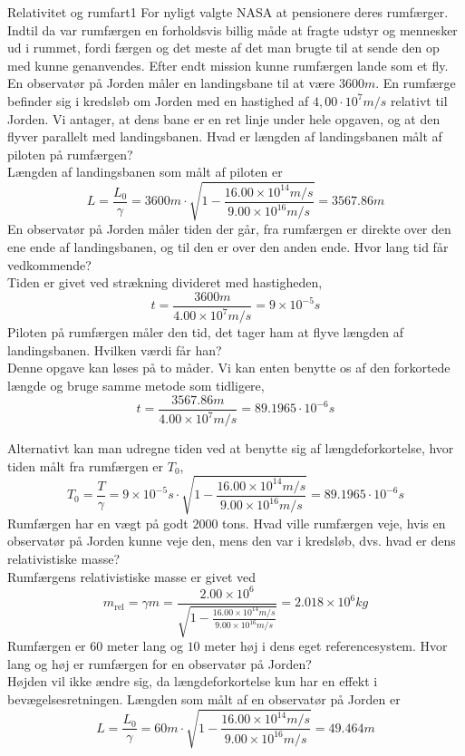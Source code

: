 \documentclass[crop=false, class=memoir]{standalone}
\begin{document}
\begin{opgave}{Relativitet og rumfart}{1}
	For nyligt valgte NASA at pensionere deres rumfærger. Indtil da var rumfærgen en forholdsvis billig måde at
	fragte udstyr og mennesker ud i rummet, fordi færgen og det meste af det man brugte til at sende den op med
	kunne genanvendes. Efter endt mission kunne rumfærgen lande som et fly.\\
	\indent
	En observatør på Jorden måler en landingsbane til at være $3600 \si{m}$. En rumfærge befinder sig i kredsløb om
	Jorden med en hastighed af $4,00 \cdot 10^7 \si{m/s}$ relativt til Jorden. Vi antager, at dens bane er en ret linje under hele
	opgaven, og at den flyver parallelt med landingsbanen.
	\opg Hvad er længden af landingsbanen målt af piloten på rumfærgen?\\
	
	Længden af landingsbanen som målt af piloten er
	$$L=\frac{L_0}{\gamma}=3600 \si{m} \cdot \sqrt{1-\frac{16.00 \times 10^{14} \si{m/s}}{9.00 \times 10^{16} \si{m/s}}} = 3567.86 \si{m}$$
	\opg En observatør på Jorden måler tiden der går, fra rumfærgen er direkte over den ene ende af landingsbanen,
	og til den er over den anden ende. Hvor lang tid får vedkommende?\\
	
	Tiden er givet ved strækning divideret med hastigheden,
	$$t=\frac{3600 \si{m}}{4.00 \times 10^7 \si{m/s}} = 9 \times 10^{-5} \si{s}$$
	\opg Piloten på rumfærgen måler den tid, det tager ham at flyve længden af landingsbanen. Hvilken værdi får
	han?\\
	
	Denne opgave kan løses på to måder. Vi kan enten benytte os af den forkortede længde og bruge samme metode som tidligere,
	$$t=\frac{3567.86 \si{m}}{4.00 \times 10^7 \si{m/s}}=89.1965 \cdot 10^{-6} \si{s}$$
	
	Alternativt kan man udregne tiden ved at benytte sig af længdeforkortelse, hvor tiden målt fra rumfærgen er $T_0$,
	$$T_0=\frac{T}{\gamma}=9 \times 10^{-5} \si{s} \cdot \sqrt{1-\frac{16.00 \times 10^{14} \si{m/s}}{9.00 \times 10^{16} \si{m/s}}}=89.1965 \cdot 10^{-6} \si{s}$$
	\opg Rumfærgen har en vægt på godt $2000$ tons. Hvad ville rumfærgen veje, hvis en observatør på Jorden
	kunne veje den, mens den var i kredsløb, dvs. hvad er dens relativistiske masse?\\
	
	Rumfærgens relativistiske masse er givet ved
	$$m_{\text{rel}}=\gamma m=\frac{2.00 \times 10^6}{\sqrt{1-\frac{16.00 \times 10^{14} \si{m/s}}{9.00 \times 10^{16} \si{m/s}}}}=2.018 \times 10^6 \si{kg}$$
	\opg Rumfærgen er $60$ meter lang og $10$ meter høj i dens eget referencesystem. Hvor lang og høj er rumfærgen
	for en observatør på Jorden?\\
	
	Højden vil ikke ændre sig, da længdeforkortelse kun har en effekt i bevægelsesretningen. Længden som målt af en observatør på Jorden er
	$$L=\frac{L_0}{\gamma}=60 \si{m} \cdot \sqrt{1-\frac{16.00 \times 10^{14} \si{m/s}}{9.00 \times 10^{16} \si{m/s}}}=49.464 \si{m}$$
\end{opgave}
\end{document}
